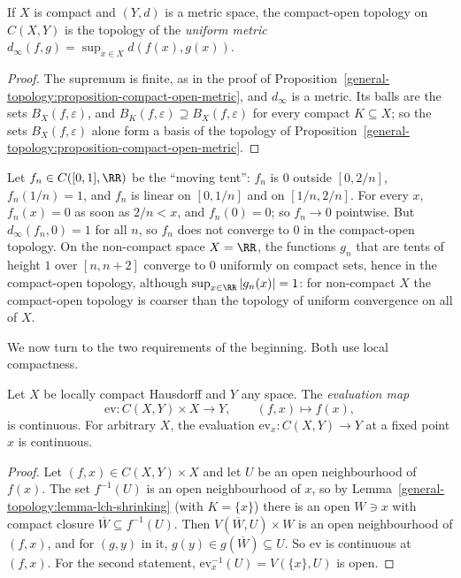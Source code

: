 \begin{corollary}\label{general-topology:corollary-compact-open-uniform}
If $X$ is compact and $(Y, d)$ is a metric space, the compact-open topology on $C(X, Y)$ is the topology of the \emph{uniform metric}
$d_\infty(f, g) = \sup_{x \in X}d(f(x), g(x))$.
\end{corollary}

\begin{proof}
The supremum is finite, as in the proof of Proposition~\ref{general-topology:proposition-compact-open-metric}, and $d_\infty$ is a metric. Its balls are the sets $B_X(f, \varepsilon)$, and
$B_K(f, \varepsilon) \supseteq B_X(f, \varepsilon)$ for every compact $K \subseteq X$; so the sets $B_X(f, \varepsilon)$ alone form a basis of the topology of
Proposition~\ref{general-topology:proposition-compact-open-metric}.
\end{proof}

\begin{example}\label{general-topology:example-uniform-not-pointwise}
Let $f_n \in C([0, 1], \RR)$ be the ``moving tent'': $f_n$ is $0$ outside $[0, 2/n]$, $f_n(1/n) = 1$, and $f_n$ is linear on $[0, 1/n]$ and on $[1/n, 2/n]$. For every $x$, $f_n(x) = 0$ as
soon as $2/n < x$, and $f_n(0) = 0$; so $f_n \to 0$ pointwise. But $d_\infty(f_n, 0) = 1$ for all $n$, so $f_n$ does not converge to $0$ in the compact-open topology. On the non-compact space
$X = \RR$, the functions $g_n$ that are tents of height $1$ over $[n, n + 2]$ converge to $0$ uniformly on compact sets, hence in the compact-open topology, although $\sup_{x \in \RR}|g_n(x)| = 1$:
for non-compact $X$ the compact-open topology is coarser than the topology of uniform convergence on all of $X$.
\end{example}

We now turn to the two requirements of the beginning. Both use local compactness.

\begin{proposition}\label{general-topology:proposition-evaluation}
Let $X$ be locally compact Hausdorff and $Y$ any space. The \emph{evaluation map}
\[
\mathrm{ev} \colon C(X, Y) \times X \to Y, \qquad (f, x) \mapsto f(x),
\]
is continuous. For arbitrary $X$, the evaluation $\mathrm{ev}_x \colon C(X, Y) \to Y$ at a fixed point $x$ is continuous.
\end{proposition}

\begin{proof}
Let $(f, x) \in C(X, Y) \times X$ and let $U$ be an open neighbourhood of $f(x)$. The set $f^{-1}(U)$ is an open neighbourhood of $x$, so by Lemma~\ref{general-topology:lemma-lch-shrinking}
(with $K = \{x\}$) there is an open $W \ni x$ with compact closure $\overline{W} \subseteq f^{-1}(U)$. Then $V(\overline{W}, U) \times W$ is an open neighbourhood of $(f, x)$, and for $(g, y)$ in it,
$g(y) \in g(\overline{W}) \subseteq U$. So $\mathrm{ev}$ is continuous at $(f, x)$. For the second statement, $\mathrm{ev}_x^{-1}(U) = V(\{x\}, U)$ is open.
\end{proof}

